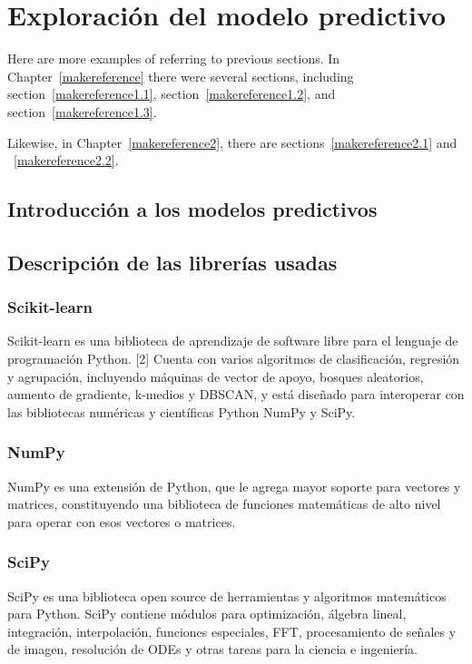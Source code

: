 \cleardoublepage

\chapter{Exploración del modelo predictivo}
\label{makereference3}

Here are more examples of referring to previous sections.  In
Chapter~\ref{makereference} there were several sections, including
section~\ref{makereference1.1}, section~\ref{makereference1.2},
and section~\ref{makereference1.3}.

Likewise, in Chapter~\ref{makereference2}, there are
sections~\ref{makereference2.1} and ~\ref{makereference2.2}.

\section{Introducción a los modelos predictivos}
\label{makereference3.1}

\section{Descripción de las librerías usadas}
\label{makereference3.2}
	\subsection{Scikit-learn}
	Scikit-learn es una biblioteca de aprendizaje de software libre para el lenguaje de programación Python. [2] Cuenta con varios algoritmos de clasificación, regresión y agrupación, incluyendo máquinas de vector de apoyo, bosques aleatorios, aumento de gradiente, k-medios y DBSCAN, y está diseñado para interoperar con las bibliotecas numéricas y científicas Python NumPy y SciPy.
	
	\subsection{NumPy}
	NumPy es una extensión de Python, que le agrega mayor soporte para vectores y matrices, constituyendo una biblioteca de funciones matemáticas de alto nivel para operar con esos vectores o matrices.
	
	\subsection{SciPy}
	SciPy es una biblioteca open source de herramientas y algoritmos matemáticos para Python. SciPy contiene módulos para optimización, álgebra lineal, integración, interpolación, funciones especiales, FFT, procesamiento de señales y de imagen, resolución de ODEs y otras tareas para la ciencia e ingeniería.
	

